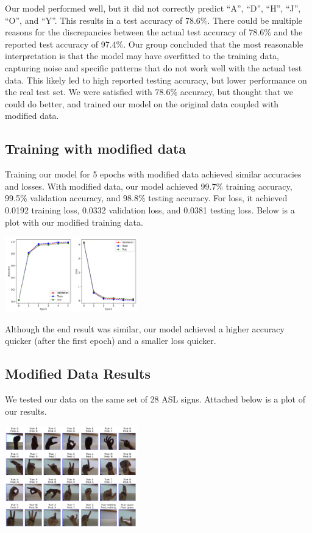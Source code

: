 \documentclass[10pt,twocolumn,letterpaper]{article}
\begin{document}
Our model performed well, but it did not correctly predict “A”, “D”, “H”, “J”, “O”, and “Y”.
This results in a test accuracy of 78.6\%. There could be multiple reasons for
the discrepancies between the actual test accuracy of 78.6\% and the reported test accuracy of 97.4\%.
Our group concluded that the most reasonable interpretation is that the model may have overfitted to the training data,
capturing noise and specific patterns that do not work well with the actual test data. This likely led to high reported
testing accuracy, but lower performance on the real test set. We were satisfied with 78.6\% accuracy,
but thought that we could do better, and trained our model on the original data coupled with modified data.

\subsection{Training with modified data}
Training our model for 5 epochs with modified data achieved similar accuracies and losses.
With modified data, our model achieved 99.7\% training accuracy, 99.5\% validation accuracy, and 98.8\%
testing accuracy. For loss, it achieved 0.0192 training loss, 0.0332 validation loss, and 0.0381
testing loss. Below is a plot with our modified training data. 

\begin{center}
    \includegraphics[width=0.43\textwidth]{../writeup_imgs/model2Plot.png}
\end{center}

Although the end result was similar, our model achieved a higher accuracy quicker 
(after the first epoch) and a smaller loss quicker. 

\subsection{Modified Data Results}
We tested our data on the same set of 28 ASL signs. Attached below is a plot of our results.

\begin{center}
    \includegraphics[width=0.43\textwidth]{../writeup_imgs/test_modified.png}
\end{center}
\end{document}
